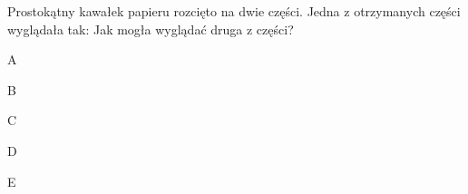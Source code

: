 \begin{tresc}
Prostokątny kawałek papieru rozcięto na dwie części. Jedna z otrzymanych części wyglądała tak: Jak mogła wyglądać druga z części?
\end{tresc}
\begin{wariant}{A}  \end{wariant}
\begin{wariant}{B}  \end{wariant}
\begin{wariant}{C}  \end{wariant}
\begin{wariant}{D}  \end{wariant}
\begin{wariant}{E}  \end{wariant}
